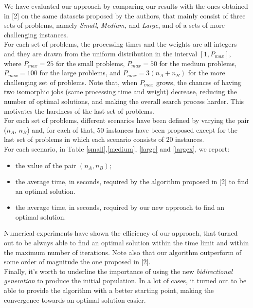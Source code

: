 \documentclass[opre,nonblindrev]{informs3} %
\begin{document}
We have evaluated our approach by comparing our results with the ones obtained in [2] on the same datasets proposed by the authors, that mainly consist of three sets of problems, namely \textit{Small}, \textit{Medium}, and \textit{Large}, and of a sets of more challenging instances.\\ For each set of problems, the processing times and the weights are all integers and they are drawn from the uniform distribution in the interval $[1,P_{max}]$, where $P_{max} = 25$ for the small problems, $P_{max}=50$ for the medium problems, $P_{max}=100$ for the large problems, and $P_{max} = 3(n_A+n_B)$ for the more challenging set of problems. Note that, when $P_{max}$ grows, the chances of having two isomorphic jobs (same processing time and weight) decrease, reducing the number of optimal solutions, and making the overall search process harder. This motivates the hardness of the last set of problems.\\    
For each set of problems, different scenarios have been defined by varying the pair ($n_A$, $n_B$) and, for each of that, 50 instances have been proposed except for the last set of problems in which each scenario consists of 20 instances.\\ 
For each scenario, in Table \ref{small},\ref{medium}, \ref{large} and \ref{largex}, we report:
\begin{itemize}
\item the value of the pair $(n_A,n_B)$;
\item the average time, in seconds, required by the algorithm proposed in [2] to find an optimal solution.
\item the average time, in seconds, required by our new approach to find an optimal solution.
\end{itemize}
Numerical experiments have shown the efficiency of our approach, that turned out to be always able to find an optimal solution within the time limit and within the maximum number of iterations. Note also that our algorithm outperform of some order of magnitude the one proposed in [2].\\
Finally, it's worth to underline the importance of using the new \textit{bidirectional generation} to produce the initial population. In a lot of cases, it turned out to be able to provide the algorithm with a better starting point, making the convergence towards an optimal solution easier.
\end{document}
